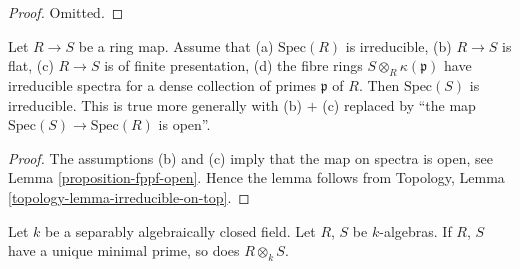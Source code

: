 \begin{proof}
Omitted.
\end{proof}

\begin{lemma}
\label{lemma-flat-fibres-irreducible}
Let $R \to S$ be a ring map. Assume that (a) $\text{Spec}(R)$ is irreducible,
(b) $R \to S$ is flat, (c) $R \to S$ is of finite presentation,
(d) the fibre rings $S \otimes_R \kappa(\mathfrak p)$ have irreducible spectra
for a dense collection of primes $\mathfrak p$ of $R$. Then $\text{Spec}(S)$
is irreducible. This is true more generally with
(b) $+$ (c) replaced by ``the map $\text{Spec}(S) \to \text{Spec}(R)$ is
open''.
\end{lemma}

\begin{proof}
The assumptions (b) and (c) imply that the map on spectra is open,
see Lemma \ref{proposition-fppf-open}. Hence the lemma follows from
Topology, Lemma \ref{topology-lemma-irreducible-on-top}.
\end{proof}

\begin{lemma}
\label{lemma-separably-closed-irreducible}
Let $k$ be a separably algebraically closed field.
Let $R$, $S$ be $k$-algebras. If $R$, $S$ have a unique
minimal prime, so does $R \otimes_k S$.
\end{lemma}

